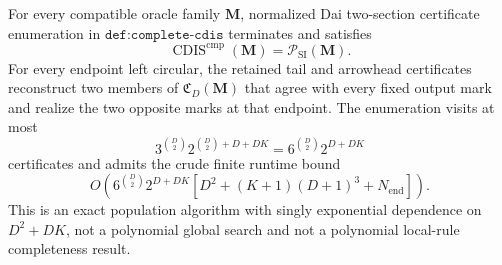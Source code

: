 For every compatible oracle family \(\mathbf M\), normalized Dai two-section certificate enumeration in \(\texttt{def:complete-cdis}\) terminates and satisfies
\[
\operatorname{CDIS}^{\mathrm{cmp}}(\mathbf M)=\mathcal P_{\mathrm{SI}}(\mathbf M).
\]
For every endpoint left circular, the retained tail and arrowhead certificates reconstruct two members of \(\mathfrak C_D(\mathbf M)\) that agree with every fixed output mark and realize the two opposite marks at that endpoint.  The enumeration visits at most
\[
3^{\binom D2}2^{\binom D2+D+DK}
=6^{\binom D2}2^{D+DK}
\]
certificates and admits the crude finite runtime bound
\[
O\!\left(6^{\binom D2}2^{D+DK}
\left[D^2+(K+1)(D+1)^3+N_{\mathrm{end}}\right]\right).
\]
This is an exact population algorithm with singly exponential dependence on \(D^2+DK\), not a polynomial global search and not a polynomial local-rule completeness result.